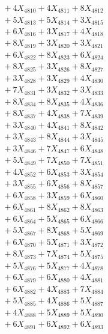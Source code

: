 \documentclass[a4paper,10pt]{article}
\begin{document}
{\begin{align}
&\;  + 4 X_{4810} + 4 X_{4811} + 8 X_{4812} \\[0.3ex]
&\;  + 5 X_{4813} + 5 X_{4814} + 3 X_{4815} \\[0.3ex]
&\;  + 6 X_{4816} + 3 X_{4817} + 4 X_{4818} \\[0.3ex]
&\;  + 8 X_{4819} + 3 X_{4820} + 3 X_{4821} \\[0.3ex]
&\;  + 6 X_{4822} + 8 X_{4823} + 6 X_{4824} \\[0.3ex]
&\;  + 8 X_{4825} + 3 X_{4826} + 8 X_{4827} \\[0.3ex]
&\;  + 3 X_{4828} + 3 X_{4829} + 4 X_{4830} \\[0.3ex]
&\;  + 7 X_{4831} + 3 X_{4832} + 3 X_{4833} \\[0.3ex]
&\;  + 8 X_{4834} + 8 X_{4835} + 4 X_{4836} \\[0.3ex]
&\;  + 8 X_{4837} + 4 X_{4838} + 7 X_{4839} \\[0.5ex]\allowbreak
&\;  + 3 X_{4840} + 4 X_{4841} + 8 X_{4842} \\[0.3ex]
&\;  + 3 X_{4843} + 8 X_{4844} + 3 X_{4845} \\[0.3ex]
&\;  + 3 X_{4846} + 7 X_{4847} + 6 X_{4848} \\[0.3ex]
&\;  + 5 X_{4849} + 7 X_{4850} + 7 X_{4851} \\[0.3ex]
&\;  + 4 X_{4852} + 6 X_{4853} + 3 X_{4854} \\[0.3ex]
&\;  + 3 X_{4855} + 6 X_{4856} + 8 X_{4857} \\[0.3ex]
&\;  + 6 X_{4858} + 3 X_{4859} + 6 X_{4860} \\[0.3ex]
&\;  + 6 X_{4861} + 8 X_{4862} + 8 X_{4863} \\[0.3ex]
&\;  + 6 X_{4864} + 5 X_{4865} + 6 X_{4866} \\[0.3ex]
&\;  + 5 X_{4867} + 8 X_{4868} + 5 X_{4869} \\[0.5ex]\allowbreak
&\;  + 6 X_{4870} + 5 X_{4871} + 3 X_{4872} \\[0.3ex]
&\;  + 8 X_{4873} + 7 X_{4874} + 5 X_{4875} \\[0.3ex]
&\;  + 5 X_{4876} + 5 X_{4877} + 4 X_{4878} \\[0.3ex]
&\;  + 6 X_{4879} + 6 X_{4880} + 4 X_{4881} \\[0.3ex]
&\;  + 6 X_{4882} + 4 X_{4883} + 7 X_{4884} \\[0.3ex]
&\;  + 5 X_{4885} + 4 X_{4886} + 5 X_{4887} \\[0.3ex]
&\;  + 4 X_{4888} + 5 X_{4889} + 5 X_{4890} \\[0.3ex]
&\;  + 6 X_{4891} + 6 X_{4892} + 6 X_{4893} \\[0.3ex]

\end{align}}
\end{document}
